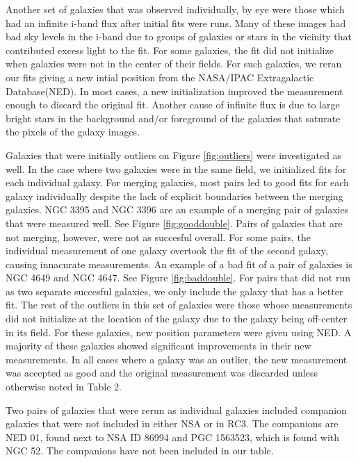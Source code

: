 \documentclass[12pt,preprint,pdftex]{aastex}
\begin{document}
Another set of galaxies that was observed individually, by eye were
those which had an infinite i-band flux after initial fits
were runs. Many of these images had bad sky levels in the i-band due
to groups of galaxies or stars in the vicinity that contributed excess
light to the fit. For some galaxies, the fit did not initialize when
galaxies were not in the center of their fields. For such galaxies, we
reran our fits giving a new intial position from the NASA/IPAC
Extragalactic Database(NED). In most cases, a new
initialization improved the measurement enough to discard the original
fit. Another cause of infinite flux is due to large bright stars in
the background and/or foreground of the galaxies that saturate the
pixels of the galaxy images.

Galaxies that were initially outliers on Figure \ref{fig:outliers}
were investigated as well. In the case where two galaxies were in the
same field, we initialized fits for each individual galaxy. For
merging galaxies, most pairs led to good fits for each galaxy
individually despite the lack of explicit boundaries between the
merging galaxies. NGC 3395 and NGC 3396 are an example of a merging
pair of galaxies that were measured well. See Figure
\ref{fig:gooddouble}. Pairs of galaxies that are not merging, however,
were not as succesful overall. For some pairs, the individual
measurement of one galaxy overtook the fit of the second galaxy,
causing innacurate measurements. An example of a bad fit of a pair of
galaxies is NGC 4649 and NGC 4647. See Figure \ref{fig:baddouble}. For
pairs that did not run as two separate succesful galaxies, we only
include the galaxy that has a better fit. The rest of the outliers in
this set of galaxies were those whose measurements did not initialize
at the location of the galaxy due to the galaxy being off-center in
its field. For these galaxies, new position parameters were given
using NED. A majority of these galaxies showed significant
improvements in their new measurements. In all cases where a galaxy
was an outlier, the new measurement was accepted as good and the
original measurement was discarded unless otherwise noted in Table 2.

Two pairs of galaxies that were rerun as individual galaxies
included companion galaxies that were not included in either
NSA or in RC3. The companions are NED 01, found next to NSA ID
86994 and PGC 1563523, which is found with NGC 52. The companions have
not been included in our table.
\end{document}
